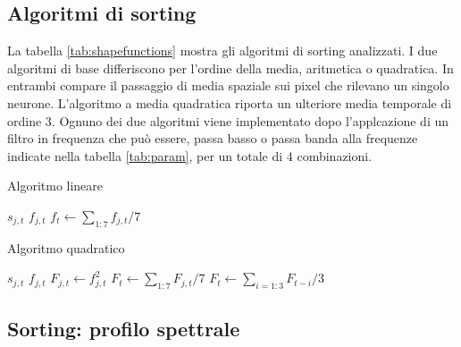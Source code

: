 \documentclass[9pt,twocolumn,twoside]{osajnl}
\begin{document}
\subsection{Algoritmi di sorting}

La tabella \ref{tab:shapefunctions} mostra gli algoritmi di sorting analizzati.
I due algoritmi di base differiscono per l'ordine della media, aritmetica o quadratica. In entrambi compare il passaggio di media spaziale sui pixel che rilevano un singolo neurone. L'algoritmo a media quadratica riporta un ulteriore media temporale di ordine $3$. Ognuno dei due algoritmi viene implementato dopo l'applcazione di un filtro in frequenza che può essere, passa basso o passa banda alla frequenze indicate nella tabella \ref{tab:param}, per un totale di $4$ combinazioni.


\begin{algorithm}
\caption{Algoritmo lineare}\label{alg:arit}
\begin{algorithmic}[1]
\State $s_{j,t}$ 
\State $f_{j,t}$ 
\State $f_{t}\gets \sum_{1:7}   f_{j,t}/7$ 
\end{algorithmic}
\end{algorithm}


\begin{algorithm}
\caption{Algoritmo quadratico}\label{alg:quad}
\begin{algorithmic}[1]
\State $s_{j,t}$ 
\State $f_{j,t}$ 
\State $F_{j,t}\gets f^{2}_{j,t}$
\State $F_{t}\gets \sum_{1:7}   F_{j,t}/7$ 
\State $F_{t}\gets \sum_{i=1:3} F_{t-i}/3$ 
\end{algorithmic}
\end{algorithm}





\subsection{Sorting: profilo spettrale}
\end{document}
